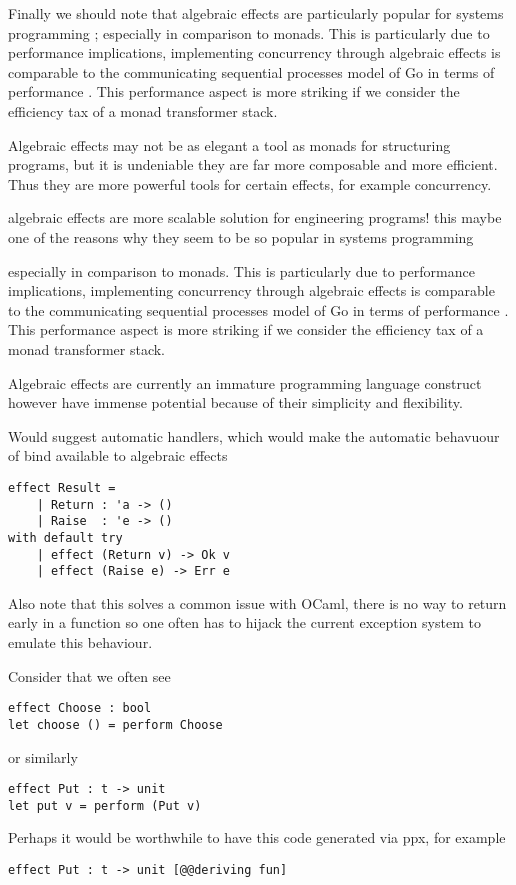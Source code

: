 Finally we should note that
algebraic effects are particularly popular for systems programming
\cite{dolan2015effective, dolan2017concurrent, dolaneffectively};
especially in comparison to monads.
This is particularly due to performance implications,
implementing concurrency through algebraic effects
is comparable to the communicating sequential processes model
of Go in terms of performance \cite{Dolan:2017}.
This performance aspect is more striking
if we consider the efficiency tax of a monad
transformer stack\cite{o2008real}.

Algebraic effects may not be as elegant a tool as monads for structuring programs,
but it is undeniable they are far more composable and more efficient.
Thus they are more powerful tools for certain effects,
for example concurrency.

algebraic effects are more scalable solution for engineering programs!
this maybe one of the reasons why they seem to be so popular in systems
programming

especially in comparison to monads.
This is particularly due to performance implications,
implementing concurrency through algebraic effects
is comparable to the communicating sequential processes model
of Go in terms of performance \cite{Dolan:2017}.
This performance aspect is more striking
if we consider the efficiency tax of a monad
transformer stack\cite{o2008real}.

Algebraic effects are currently an
immature programming language construct
however have immense potential because of 
their simplicity and flexibility.

Would suggest automatic handlers,
which would make the automatic behavuour of bind
available to algebraic effects
\begin{verbatim}
effect Result =
    | Return : 'a -> ()
    | Raise  : 'e -> ()
with default try
    | effect (Return v) -> Ok v
    | effect (Raise e) -> Err e
\end{verbatim}
Also note that this solves a common issue with
OCaml, there is no way to return early in a function
so one often has to hijack the current exception
system to emulate this behaviour.

Consider that we often see
\begin{verbatim}
effect Choose : bool
let choose () = perform Choose\end{verbatim}
or similarly
\begin{verbatim}
effect Put : t -> unit
let put v = perform (Put v)
\end{verbatim}
Perhaps it would be worthwhile to have this code
generated via ppx, for example
\begin{verbatim}
effect Put : t -> unit [@@deriving fun]
\end{verbatim}

